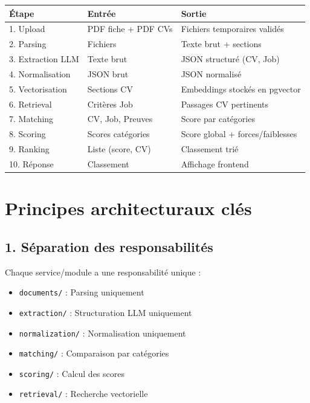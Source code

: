 \documentclass[12pt,a4paper,oneside]{book}
\begin{document}
\begin{center}
\begin{tabular}{|l|l|l|}
\hline
\textbf{Étape} & \textbf{Entrée} & \textbf{Sortie} \\
\hline
1. Upload & PDF fiche + PDF CVs & Fichiers temporaires validés \\
\hline
2. Parsing & Fichiers & Texte brut + sections \\
\hline
3. Extraction LLM & Texte brut & JSON structuré (CV, Job) \\
\hline
4. Normalisation & JSON brut & JSON normalisé \\
\hline
5. Vectorisation & Sections CV & Embeddings stockés en pgvector \\
\hline
6. Retrieval & Critères Job & Passages CV pertinents \\
\hline
7. Matching & CV, Job, Preuves & Score par catégories \\
\hline
8. Scoring & Scores catégories & Score global + forces/faiblesses \\
\hline
9. Ranking & Liste (score, CV) & Classement trié \\
\hline
10. Réponse & Classement & Affichage frontend \\
\hline
\end{tabular}
\end{center}

\section{Principes architecturaux clés}

\subsection{1. Séparation des responsabilités}

Chaque service/module a une responsabilité unique :
\begin{itemize}
    \item \texttt{documents/} : Parsing uniquement
    \item \texttt{extraction/} : Structuration LLM uniquement
    \item \texttt{normalization/} : Normalisation uniquement
    \item \texttt{matching/} : Comparaison par catégories
    \item \texttt{scoring/} : Calcul des scores
    \item \texttt{retrieval/} : Recherche vectorielle
\end{itemize}
\end{document}
